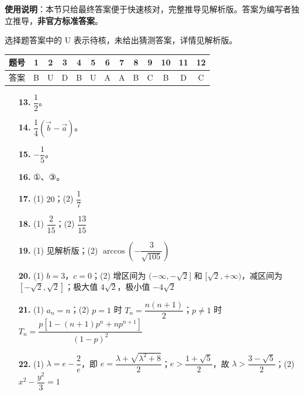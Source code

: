 
\begin{gknotice}
\textbf{使用说明}：本节只给最终答案便于快速核对，完整推导见解析版。答案为编写者独立推导，\textbf{非官方标准答案}。
\end{gknotice}

\begin{gknotice}
选择题答案中的 U 表示待核，未给出猜测答案，详情见解析版。
\end{gknotice}

\begin{center}\begin{tabular}{ccccccccccccc}
\toprule
题号 & 1 & 2 & 3 & 4 & 5 & 6 & 7 & 8 & 9 & 10 & 11 & 12 \\
\midrule
答案 & B & U & D & B & U & A & A & B & C & B & D & C \\
\bottomrule
\end{tabular}\end{center}

\begin{itemize}[leftmargin=2.6em]
  \item[\textbf{13.}] $\dfrac12$。
  \item[\textbf{14.}] $\dfrac14(\vec b-\vec a)$。
  \item[\textbf{15.}] $-\dfrac15$。
  \item[\textbf{16.}] ①、③。
\end{itemize}

\begin{itemize}[leftmargin=2.6em]
  \item[\textbf{17.}] (1) $20$；(2) $\dfrac17$
  \item[\textbf{18.}] (1) $\dfrac2{15}$；(2) $\dfrac{13}{15}$
  \item[\textbf{19.}] (1) 见解析版；(2) $\arccos\!\left(-\dfrac3{\sqrt{105}}\right)$
  \item[\textbf{20.}] (1) $b=3$，$c=0$；(2) 增区间为 $(-\infty,-\sqrt2]$ 和 $[\sqrt2,+\infty)$，减区间为 $[-\sqrt2,\sqrt2]$；极大值 $4\sqrt2$，极小值 $-4\sqrt2$
  \item[\textbf{21.}] (1) $a_n=n$；(2) $p=1$ 时 $T_n=\dfrac{n(n+1)}2$；$p\ne1$ 时 $T_n=\dfrac{p[1-(n+1)p^n+np^{n+1}]}{(1-p)^2}$
  \item[\textbf{22.}] (1) $\lambda=e-\dfrac2e$，即 $e=\dfrac{\lambda+\sqrt{\lambda^2+8}}2$；$e>\dfrac{1+\sqrt5}2$，故 $\lambda>\dfrac{3-\sqrt5}2$；(2) $x^2-\dfrac{y^2}{3}=1$
\end{itemize}

